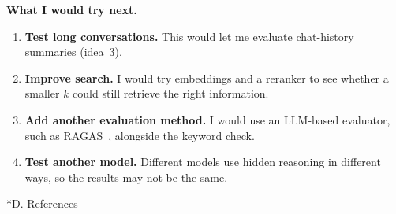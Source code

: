 \documentclass[10pt,a4paper]{article}
\makeatletter
\renewcommand\section{\@startsection{section}{1}{\z@}{0.9em}{0.35em}{\normalfont\large\bfseries}}
\makeatother
\begin{document}
\textbf{What I would try next.}
\begin{enumerate}
\item \textbf{Test long conversations.} This would let me evaluate chat-history summaries (idea~3).
\item \textbf{Improve search.} I would try embeddings and a reranker to see whether a smaller $k$ could still retrieve the right information.
\item \textbf{Add another evaluation method.} I would use an LLM-based evaluator, such as RAGAS~\cite{ragas}, alongside the keyword check.
\item \textbf{Test another model.} Different models use hidden reasoning in different ways, so the results may not be the same.
\end{enumerate}

\newpage
\section*{D. References}
\begingroup
\renewcommand{\section}[2]{}%
\small
\end{document}
